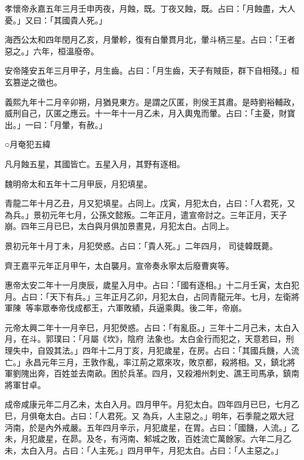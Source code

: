 \begin{pinyinscope}
 孝懷帝永嘉五年三月壬申丙夜，月蝕，既。丁夜又蝕，既。占曰：「月蝕盡，大人憂。」又曰：「其國貴人死。」



 海西公太和四年閏月乙亥，月暈軫，復有白暈貫月北，暈斗柄三星。占曰：「王者惡之。」六年，桓溫廢帝。



 安帝隆安五年三月甲子，月生齒。占曰：「月生齒，天子有賊臣，群下自相殘。」桓玄篡逆之徵也。



 義熙九年十二月辛卯朔，月猶見東方。是謂之仄匿，則侯王其肅。是時劉裕輔政，威刑自己，仄匿之應云。十一年十一月乙未，月入輿鬼而暈。占曰：「主憂，財寶
 出。」一曰：「月暈，有赦。」



 ○月奄犯五緯



 凡月蝕五星，其國皆亡。五星入月，其野有逐相。



 魏明帝太和五年十二月甲辰，月犯填星。



 青龍二年十月乙丑，月又犯填星。占同上。戊寅，月犯太白，占曰：「人君死，又為兵。」景初元年七月，公孫文懿叛。二年正月，遣宣帝討之。三年正月，天子崩。四年三月已巳，太白與月俱加景晝見，月犯太白。占同上。



 景初元年十月丁未，月犯熒惑。占曰：「貴人死。」二年四月，
 司徒韓既薨。



 齊王嘉平元年正月甲午，太白襲月。宣帝奏永寧太后廢曹爽等。



 惠帝太安二年十一月庚辰，歲星入月中。占曰：「國有逐相。」十二月壬寅，太白犯月。占曰：「天下有兵。」三年正月乙卯，月犯太白，占同青龍元年。七月，左衛將軍陳等率眾奉帝伐成都王，六軍敗績，兵逼乘輿。後二年，帝崩。



 元帝太興二年十一月辛巳，月犯熒惑。占曰：「有亂臣。」三年十二月己未，太白入月，在斗。郭璞曰：「月屬《坎》，陰府
 法象也。太白金行而犯之，天意若曰，刑理失中，自毀其法。」四年十二月丁亥，月犯歲星，在房。占曰：「其國兵饑，人流亡。」永昌元年三月，王敦作亂，率江荊之眾來攻，敗京都，殺將相。又，鎮北將軍劉隗出奔，百姓並去南畝。困於兵革。四月，又殺湘州刺史、譙王司馬承，鎮南將軍甘卓。



 成帝咸康元年二月乙未，太白入月。四月甲午。月犯太白。四年四月已巳，七月乙巳，月俱奄太白。占曰：「人君死。又
 為兵，人主惡之。」明年，石季龍之眾大冠沔南，於是內外戒嚴。五年四月辛示，月犯歲星，在胃。占曰：「國饑，人流。」乙未，月犯歲星，在昴。及冬，有沔南、邾城之敗，百姓流亡萬餘家。六年二月乙未，太白入月。占曰：「人主死。」四月甲午，月犯太白。占曰：「人主惡之。」




\end{pinyinscope}
